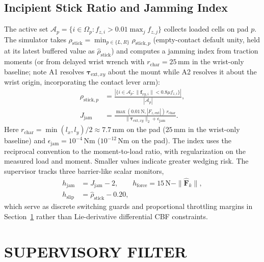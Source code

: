 \documentclass[letterpaper,10pt,conference]{IEEEtran}
\begin{document}
\subsection{Incipient Stick Ratio and Jamming Index}
The active set $\mathcal A_p=\{i\in\Omega_p : f_{z,i}>0.01\max_j f_{z,j}\}$ collects loaded cells on pad $p$. The simulator takes $\rho_{\mathrm{stick}}=\min_{p\in\{L,R\}}\rho_{\mathrm{stick},p}$ (empty-contact default unity, held at its latest buffered value as $\hat\rho_{\mathrm{stick}}$) and computes a jamming index from traction moments (or from delayed wrist wrench with $r_{\mathrm{char}}=25$\,mm in the wrist-only baseline; note A1 resolves $\boldsymbol\tau_{\mathrm{ext},xy}$ about the mount while A2 resolves it about the wrist origin, incorporating the contact lever arm):
\begin{equation}
\begin{aligned}
\rho_{\mathrm{stick},p}
 &= \frac{|\{i\in\mathcal A_p : \|\mathbf f_{xy,i}\| < 0.8\mu f_{z,i}\}|}{|\mathcal A_p|},\\
J_{\mathrm{jam}}
 &= \frac{\max(0.01\,\mathrm N,|F_{z,\mathrm{ext}}|)\,r_{\mathrm{char}}}
          {\|\boldsymbol\tau_{\mathrm{ext},xy}\|_2+\epsilon_{\mathrm{jam}}}.
\end{aligned}
\label{eq:stick_jam}
\end{equation}
Here $r_{\mathrm{char}}=\min(l_x,l_y)/2\approx7.7$\,mm on the pad ($25$\,mm in the wrist-only baseline) and $\epsilon_{\mathrm{jam}}=10^{-4}$\,Nm ($10^{-12}$\,Nm on the pad). The index uses the reciprocal convention to the moment-to-load ratio, with regularization on the measured load and moment. Smaller values indicate greater wedging risk. The supervisor tracks three barrier-like scalar monitors,
\[
\begin{aligned}
h_{\mathrm{jam}}&=J_{\mathrm{jam}}-2,\qquad
h_{\mathrm{force}}=15\,\mathrm{N}-\|\hat{\mathbf F}_k\|,\\
h_{\mathrm{slip}}&=\hat\rho_{\mathrm{stick}}-0.20 ,
\end{aligned}
\]
which serve as discrete switching guards and proportional throttling margins in Section~\ref{sec:supervisor} rather than Lie-derivative differential CBF constraints.

\section{SUPERVISORY FILTER}
\label{sec:supervisor}
\end{document}
